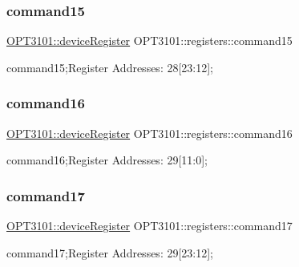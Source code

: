 \subsubsection{\texorpdfstring{command15}{command15}}
{\footnotesize\ttfamily \mbox{\hyperlink{class_o_p_t3101_1_1device_register}{O\+P\+T3101\+::device\+Register}} O\+P\+T3101\+::registers\+::command15}



command15;Register Addresses\+: 28\mbox{[}23\+:12\mbox{]}; 

\mbox{\label{class_o_p_t3101_1_1registers_aa1165c37fd9c29c5d036651597fee639}} 
\subsubsection{\texorpdfstring{command16}{command16}}
{\footnotesize\ttfamily \mbox{\hyperlink{class_o_p_t3101_1_1device_register}{O\+P\+T3101\+::device\+Register}} O\+P\+T3101\+::registers\+::command16}



command16;Register Addresses\+: 29\mbox{[}11\+:0\mbox{]}; 

\mbox{\label{class_o_p_t3101_1_1registers_a3ed3c3a38ee26317db4c08fd08bf58c3}} 
\subsubsection{\texorpdfstring{command17}{command17}}
{\footnotesize\ttfamily \mbox{\hyperlink{class_o_p_t3101_1_1device_register}{O\+P\+T3101\+::device\+Register}} O\+P\+T3101\+::registers\+::command17}



command17;Register Addresses\+: 29\mbox{[}23\+:12\mbox{]}; 

\mbox{\label{class_o_p_t3101_1_1registers_a6a1a67503b4b7b9e5de9035c105615ca}} 
